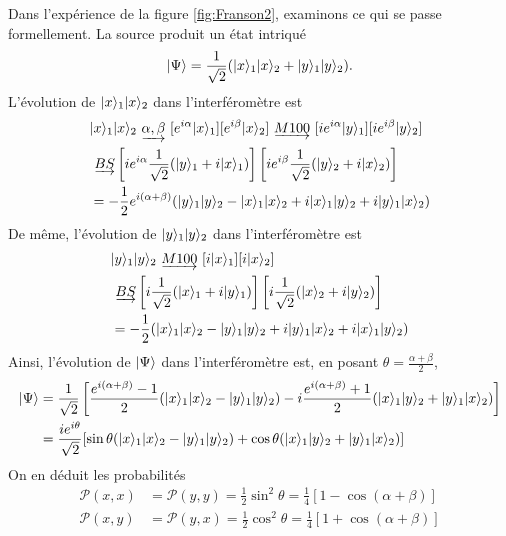 Dans l'expérience de la figure \ref{fig:Franson2}, examinons ce qui se passe
formellement. La source produit un état intriqué%
\begin{equation}
\vert\Psi\rangle=\frac{1}{\sqrt{2}}(\vert x\rangle_{1}\vert x\rangle_{2}+\vert y\rangle_{1}\vert y\rangle_{2}).
\end{equation}
L'évolution de $\vert x\rangle_{1}\vert x\rangle_{2}$
dans l'interféromètre est%
\begin{equation}
\begin{split}
&  \ket{x}_{1}\ket{x}_{2}%
\ \underrightarrow{\alpha,\beta}\ [e^{i\alpha}\ket{x}
_{1}][e^{i\beta}\ket{x}_{2}]\ \underrightarrow
{M100}\ [ie^{i\alpha}\ket{y}_{1}][ie^{i\beta}\ket{y}_{2}]\\
&  \ \underrightarrow{BS}\left[
ie^{i\alpha}\frac{1}{\sqrt{2}}(\ket{y}_{1}+i\ket{x}_{1})\right]
\left[ie^{i\beta}\frac{1}{\sqrt{2}}(\ket{y}_{2}+i\ket{x}_{2})\right]  \\
&  =-\frac{1}{2}e^{i(\alpha+\beta)}(\ket{y}_{1}\ket{y}_{2}-\ket{x}_{1}\ket{x}
_{2}+i\ket{x}_{1}\ket{y}_{2}+i\ket{y}_{1}\ket{x}_{2})
\end{split}
\end{equation}
De même, l'évolution de $\vert y\rangle_{1}\vert y\rangle_{2}$ dans l'interféromètre est%
\begin{equation}
\begin{split}
&  \ket{y}_{1}\ket{y}_{2}%
\ \underrightarrow{M100}\ [i\ket{x}_{1}][i\ket{x}_{2}]\\
&  \
\underrightarrow{BS}\left[i\frac{1}{\sqrt{2}}(\ket{x}_{1}+i\ket{y}_{1})\right]
\left[  i\frac{1}{\sqrt{2}}(\ket{x}_{2}+i\ket{y}_{2})\right]  \\
&
=-\frac{1}{2}(\ket{x}_{1}\ket{x}_{2}-\ket{y}_{1}\ket{y}_{2}+i\ket{y}_{1}\ket{x}_
{2}+i\ket{x}_{1}\ket{y}_{2})
\end{split}
\end{equation}
Ainsi, l'évolution de $\vert\Psi\rangle$ dans l'interféromètre
est, en posant $\theta=\frac{\alpha+\beta}{2}$,%
\begin{equation}
\begin{split}
\vert\Psi\rangle &
=\frac{1}{\sqrt{2}}\left[\frac{e^{i(\alpha+\beta)}-1}{2}(\vert x\rangle_{1}\vert x\rangle _{2}
-\vert y\rangle_{1}\vert y\rangle_{2})-i\frac{e^{i(\alpha+\beta)}+1}{2}(\vert x\rangle_{1}\vert y\rangle_{2}
+\vert y\rangle_{1}\vert x\rangle _{2})\right]  \\
&
=\frac{ie^{i\theta}}{\sqrt{2}}[\sin\theta(\vert x\rangle_{1}\vert x\rangle_{2}-\vert y\rangle_{1}
\vert y\rangle_{2})+\cos\theta(\vert x\rangle_{1}\vert y\rangle_{2}+\vert y\rangle_{1}\vert x\rangle_{2})]
\end{split}
\end{equation}
On en déduit les probabilités%
\begin{subequations}%
\begin{align}
\mathcal{P}(x,x) &  =\mathcal{P}(y,y)=\frac{1}{2}\sin^{2}\theta=\frac{1}%
{4}[1-\cos(\alpha+\beta)]\\
\mathcal{P}(x,y) &  =\mathcal{P}(y,x)=\frac{1}{2}\cos^{2}\theta=\frac{1}%
{4}[1+\cos(\alpha+\beta)]
\end{align}%
\end{subequations}%

